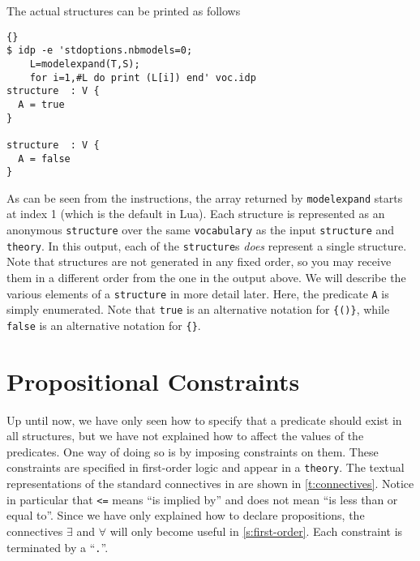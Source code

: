 \documentclass{article}
\begin{document}
The actual structures can be printed as follows
\begin{lstlisting}{}
$ idp -e 'stdoptions.nbmodels=0;
    L=modelexpand(T,S);
    for i=1,#L do print (L[i]) end' voc.idp 
structure  : V {
  A = true
}

structure  : V {
  A = false
}

\end{lstlisting}
As can be seen from the instructions, the array
returned by \lstinline{modelexpand}
starts at index 1 (which is the default in Lua).
Each structure is represented as an anonymous \texttt{structure} over the same
\texttt{vocabulary} as the input \texttt{structure} and \texttt{theory}.
In this output, each of the \texttt{structure}s \emph{does} represent
a single structure.
Note that structures are not generated in any fixed order,
so you may receive them in a different order from the one in the output
above.
We will describe the various elements of a \texttt{structure} in more
detail later.  Here, the predicate \texttt{A} is simply enumerated.
Note that \texttt{true} is an alternative notation
for \lstinline!{()}!, while \texttt{false} is an alternative notation
for \lstinline!{}!.

\section{Propositional Constraints}\label{s:propositional}

Up until now, we have only seen how to specify that a predicate
should exist in all structures, but we have not explained how
to affect the values of the predicates.
One way of doing so is by imposing constraints on them.
These constraints are specified in first-order logic and appear
in a \texttt{theory}.
The textual representations of the standard connectives
in \idp are shown in \autoref{t:connectives}.
Notice in particular that \texttt{<=} means ``is implied by''
and does not mean ``is less than or equal to''.
Since we have only explained how to declare propositions,
the connectives $\exists$ and $\forall$ will only become useful
in \autoref{s:first-order}.
Each constraint is terminated by a ``\texttt{.}''.
\end{document}
